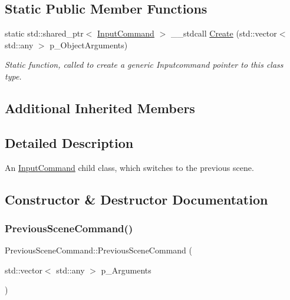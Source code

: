 \subsection*{Static Public Member Functions}
\begin{DoxyCompactItemize}
\item 
static std\+::shared\+\_\+ptr$<$ \mbox{\hyperlink{class_input_command}{Input\+Command}} $>$ \+\_\+\+\_\+stdcall \mbox{\hyperlink{class_previous_scene_command_a6019fd6d0a047b7a0d9ed9614faaf2f1}{Create}} (std\+::vector$<$ std\+::any $>$ p\+\_\+\+Object\+Arguments)
\begin{DoxyCompactList}\small\item\em Static function, called to create a generic Inputcommand pointer to this class type. \end{DoxyCompactList}\end{DoxyCompactItemize}
\subsection*{Additional Inherited Members}


\subsection{Detailed Description}
An \mbox{\hyperlink{class_input_command}{Input\+Command}} child class, which switches to the previous scene. 

\subsection{Constructor \& Destructor Documentation}
\mbox{\label{class_previous_scene_command_a1a10301714fec1628347d627dff2e9f9}} 
\subsubsection{\texorpdfstring{PreviousSceneCommand()}{PreviousSceneCommand()}}
{\footnotesize\ttfamily Previous\+Scene\+Command\+::\+Previous\+Scene\+Command (\begin{DoxyParamCaption}\item[{std\+::vector$<$ std\+::any $>$}]{p\+\_\+\+Arguments }\end{DoxyParamCaption})\hspace{0.3cm}{\ttfamily [inline]}}



